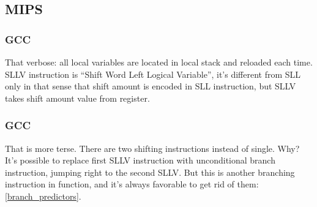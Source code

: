 \ifx\RUSSIAN\undefined
\subsection{MIPS}

\subsubsection{\NonOptimizing GCC}



That verbose: all local variables are located in local stack and reloaded each time.
SLLV instruction is ``Shift Word Left Logical Variable'', it's different from SLL only in that sense
that shift amount is encoded in SLL instruction, but SLLV takes shift amount value from register.

\subsubsection{\Optimizing GCC}

That is more terse.
There are two shifting instructions instead of single.
Why?
It's possible to replace first SLLV instruction with unconditional branch instruction, 
jumping right to the second SLLV.
But this is another branching instruction in function, and it's always favorable to get rid of them: 
\ref{branch_predictors}.



\fi
